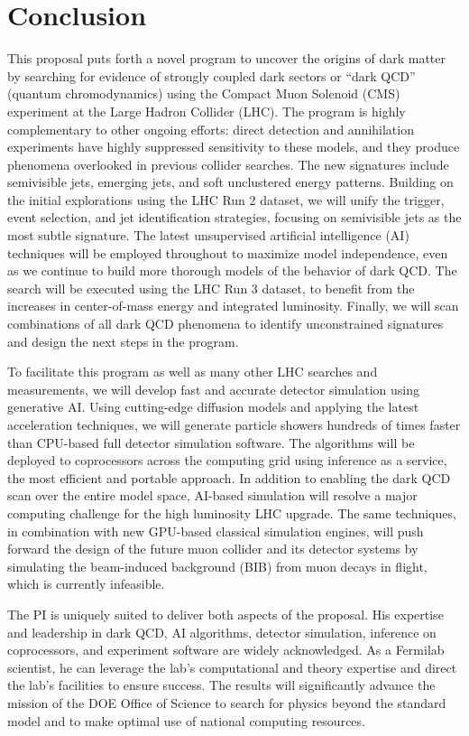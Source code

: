 \section{Conclusion}\label{sec:conclusion}

This proposal puts forth a novel program to uncover the origins of dark matter
by searching for evidence of strongly coupled dark sectors or ``dark QCD'' (quantum chromodynamics)
using the Compact Muon Solenoid (CMS) experiment at the Large Hadron Collider (LHC).
The program is highly complementary to other ongoing efforts:
direct detection and annihilation experiments have highly suppressed sensitivity to these models,
and they produce phenomena overlooked in previous collider searches.
The new signatures include semivisible jets, emerging jets, and soft unclustered energy patterns.
Building on the initial explorations using the LHC Run 2 dataset,
we will unify the trigger, event selection, and jet identification strategies,
focusing on semivisible jets as the most subtle signature.
The latest unsupervised artificial intelligence (AI) techniques will be employed throughout to maximize model independence,
even as we continue to build more thorough models of the behavior of dark QCD.
The search will be executed using the LHC Run 3 dataset,
to benefit from the increases in center-of-mass energy and integrated luminosity.
Finally, we will scan combinations of all dark QCD phenomena to identify unconstrained signatures
and design the next steps in the program.

To facilitate this program as well as many other LHC searches and measurements,
we will develop fast and accurate detector simulation using generative AI.
Using cutting-edge diffusion models and applying the latest acceleration techniques,
we will generate particle showers hundreds of times faster than CPU-based full detector simulation software.
The algorithms will be deployed to coprocessors across the computing grid using inference as a service,
the most efficient and portable approach.
In addition to enabling the dark QCD scan over the entire model space,
AI-based simulation will resolve a major computing challenge for the high luminosity LHC upgrade.
The same techniques, in combination with new GPU-based classical simulation engines,
will push forward the design of the future muon collider and its detector systems
by simulating the beam-induced background (BIB) from muon decays in flight, which is currently infeasible.

The PI is uniquely suited to deliver both aspects of the proposal.
His expertise and leadership in dark QCD, AI algorithms, detector simulation, inference on coprocessors, and experiment software are widely acknowledged.
As a Fermilab scientist, he can leverage the lab's computational and theory expertise and direct the lab's facilities to ensure success.
The results will significantly advance the mission of the DOE Office of Science to search for physics beyond the standard model and to make optimal use of national computing resources.

